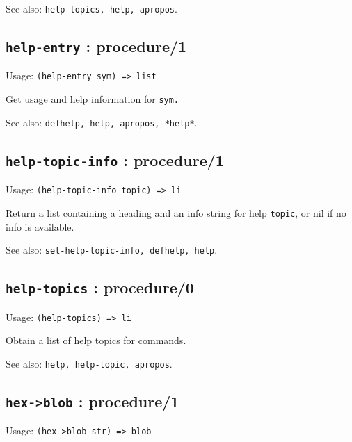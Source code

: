 \documentclass[
]{article}
\newcommand{\passthrough}[1]{#1}
\begin{document}
See also: \passthrough{\lstinline!help-topics, help, apropos!}.

\hypertarget{help-entry-procedure1-1}{%
\subsection{\texorpdfstring{\texttt{help-entry} :
procedure/1}{help-entry : procedure/1}}\label{help-entry-procedure1-1}}

Usage: \passthrough{\lstinline!(help-entry sym) => list!}

Get usage and help information for \passthrough{\lstinline!sym.!}

See also: \passthrough{\lstinline!defhelp, help, apropos, *help*!}.

\hypertarget{help-topic-info-procedure1-1}{%
\subsection{\texorpdfstring{\texttt{help-topic-info} :
procedure/1}{help-topic-info : procedure/1}}\label{help-topic-info-procedure1-1}}

Usage: \passthrough{\lstinline!(help-topic-info topic) => li!}

Return a list containing a heading and an info string for help
\passthrough{\lstinline!topic!}, or nil if no info is available.

See also: \passthrough{\lstinline!set-help-topic-info, defhelp, help!}.

\hypertarget{help-topics-procedure0-1}{%
\subsection{\texorpdfstring{\texttt{help-topics} :
procedure/0}{help-topics : procedure/0}}\label{help-topics-procedure0-1}}

Usage: \passthrough{\lstinline!(help-topics) => li!}

Obtain a list of help topics for commands.

See also: \passthrough{\lstinline!help, help-topic, apropos!}.

\hypertarget{hex-blob-procedure1-1}{%
\subsection{\texorpdfstring{\texttt{hex-\textgreater{}blob} :
procedure/1}{hex-\textgreater blob : procedure/1}}\label{hex-blob-procedure1-1}}

Usage: \passthrough{\lstinline!(hex->blob str) => blob!}
\end{document}

